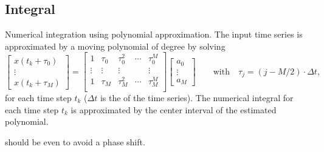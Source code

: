 \subsection{Integral}
Numerical integration using polynomial approximation.
The input time series is approximated by a moving polynomial of degree 
by solving
\begin{equation}
  \begin{bmatrix} x(t_k+\tau_0) \\ \vdots \\ x(t_k+\tau_M) \end{bmatrix}
  =
  \begin{bmatrix}
  1      & \tau_0 & \tau_0^2 & \cdots & \tau_0^M \\
  \vdots & \vdots & \vdots   &        & \vdots   \\
  1      & \tau_M & \tau_M^2 & \cdots & \tau_M^M \\
  \end{bmatrix}%
  \begin{bmatrix}
  a_0 \\ \vdots \\ a_M
  \end{bmatrix}
  \qquad\text{with}\quad
  \tau_j =  (j-M/2)\cdot \Delta t,
\end{equation}
for each time step $t_k$ ($\Delta t$ is the  of the time series).
The numerical integral for each time step $t_k$ is approximated by the center interval of the estimated polynomial.


 should be even to avoid a phase shift.


